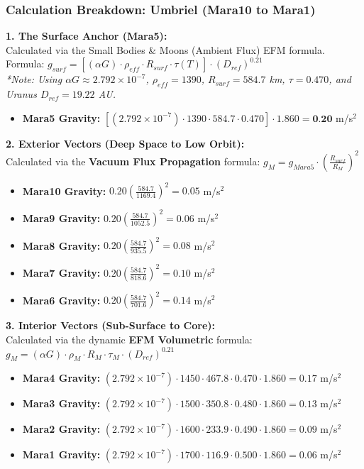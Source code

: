 \documentclass[11pt, a4paper]{article}
\begin{document}
\clearpage
\subsubsection{Calculation Breakdown: Umbriel (Mara10 to Mara1)}

\noindent \textbf{1. The Surface Anchor (Mara5):} \\
Calculated via the Small Bodies \& Moons (Ambient Flux) EFM formula. \\
Formula: $g_{surf} = \left[ (\alpha G) \cdot \rho_{eff} \cdot R_{surf} \cdot \tau(T) \right] \cdot (D_{ref})^{0.21}$ \\
\textit{*Note: Using $\alpha G \approx 2.792 \times 10^{-7}$, $\rho_{eff} = 1390$, $R_{surf} = 584.7$ km, $\tau = 0.470$, and Uranus $D_{ref} = 19.22$ AU.}
\begin{itemize}
  \item \textbf{Mara5 Gravity:} $\left[ (2.792 \times 10^{-7}) \cdot 1390 \cdot 584.7 \cdot 0.470 \right] \cdot 1.860 = \textbf{0.20}$ m/s$^2$
\end{itemize}

\vspace{0.5em}
\noindent \textbf{2. Exterior Vectors (Deep Space to Low Orbit):} \\
Calculated via the \textbf{Vacuum Flux Propagation} formula: $g_M = g_{Mara5} \cdot \left( \frac{R_{surf}}{R_M} \right)^2$
\begin{itemize}
  \item \textbf{Mara10 Gravity:} $0.20 \left( \frac{584.7}{1169.4} \right)^2 = 0.05$ m/s$^2$
  \item \textbf{Mara9 Gravity:} $0.20 \left( \frac{584.7}{1052.5} \right)^2 = 0.06$ m/s$^2$
  \item \textbf{Mara8 Gravity:} $0.20 \left( \frac{584.7}{935.5} \right)^2 = 0.08$ m/s$^2$
  \item \textbf{Mara7 Gravity:} $0.20 \left( \frac{584.7}{818.6} \right)^2 = 0.10$ m/s$^2$
  \item \textbf{Mara6 Gravity:} $0.20 \left( \frac{584.7}{701.6} \right)^2 = 0.14$ m/s$^2$
\end{itemize}

\vspace{0.5em}
\noindent \textbf{3. Interior Vectors (Sub-Surface to Core):} \\
Calculated via the dynamic \textbf{EFM Volumetric} formula: $g_M = (\alpha G) \cdot \rho_{M} \cdot R_M \cdot \tau_M \cdot (D_{ref})^{0.21}$
\begin{itemize}
  \item \textbf{Mara4 Gravity:} $(2.792 \times 10^{-7}) \cdot 1450 \cdot 467.8 \cdot 0.470 \cdot 1.860 = 0.17$ m/s$^2$
  \item \textbf{Mara3 Gravity:} $(2.792 \times 10^{-7}) \cdot 1500 \cdot 350.8 \cdot 0.480 \cdot 1.860 = 0.13$ m/s$^2$
  \item \textbf{Mara2 Gravity:} $(2.792 \times 10^{-7}) \cdot 1600 \cdot 233.9 \cdot 0.490 \cdot 1.860 = 0.09$ m/s$^2$
  \item \textbf{Mara1 Gravity:} $(2.792 \times 10^{-7}) \cdot 1700 \cdot 116.9 \cdot 0.500 \cdot 1.860 = 0.06$ m/s$^2$
\end{itemize}
\end{document}

